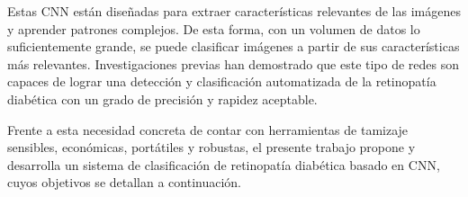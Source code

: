 Estas CNN están diseñadas para extraer características relevantes de las imágenes y aprender
patrones complejos. De esta forma, con un volumen de datos lo suficientemente grande, se
puede clasificar imágenes a partir de sus características más relevantes. Investigaciones
previas  han demostrado que este tipo de redes son capaces
de lograr una detección y clasificación automatizada de la retinopatía diabética con un
grado de precisión y rapidez aceptable.

Frente a esta necesidad concreta de contar con herramientas de tamizaje sensibles,
económicas, portátiles y robustas, el presente trabajo propone y desarrolla un sistema de
clasificación de retinopatía diabética basado en CNN, cuyos objetivos se detallan a
continuación.
